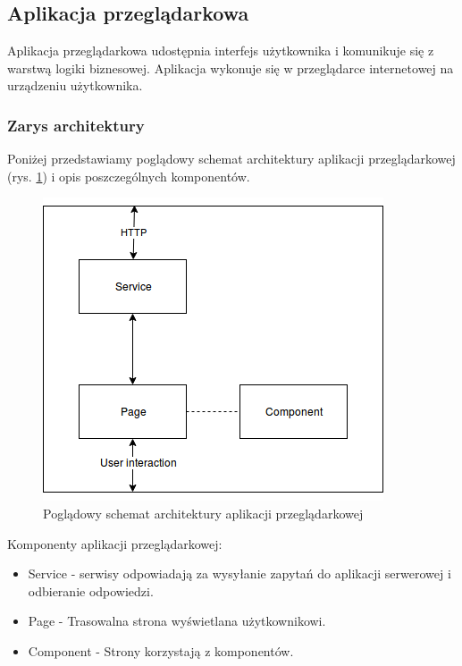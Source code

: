 \documentclass[polish,12pt]{aghthesis}
\begin{document}
\subsection{Aplikacja przeglądarkowa}
Aplikacja przeglądarkowa udostępnia interfejs użytkownika i komunikuje się z warstwą logiki biznesowej. Aplikacja wykonuje się w przeglądarce internetowej na urządzeniu użytkownika.

\subsubsection{Zarys architektury}
Poniżej przedstawiamy poglądowy schemat architektury aplikacji przeglądarkowej (rys. \ref{front-schema}) i opis poszczególnych komponentów.

\begin{figure}[H]
    \includegraphics[width=\textwidth]{front-schema}
    \caption{Poglądowy schemat architektury aplikacji przeglądarkowej}
    \label{front-schema}
\end{figure}

Komponenty aplikacji przeglądarkowej:
\begin{itemize}
    \item Service - serwisy odpowiadają za wysyłanie zapytań do aplikacji serwerowej i odbieranie odpowiedzi.
    \item Page - Trasowalna strona wyświetlana użytkownikowi.
    \item Component - Strony korzystają z komponentów.
\end{itemize}
\end{document}
